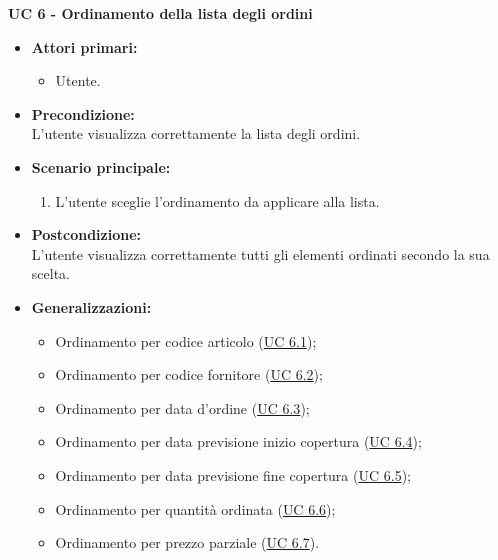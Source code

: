 \vspace{0.5cm}

\noindent \textbf{\large UC 6 - Ordinamento della lista degli ordini}
\label{uc:ordinamento-elementi-lista}
\begin{itemize}

	\item \textbf{Attori primari: }
		\begin{itemize}
			\item Utente.
		\end{itemize}

	\item \textbf{Precondizione: }\\[0.3cm]
		L'utente visualizza correttamente la lista degli ordini.

	\item \textbf{Scenario principale: }
		\begin{enumerate}
			\item L'utente sceglie l'ordinamento da applicare alla lista.
		\end{enumerate}
		

	\item \textbf{Postcondizione: }\\[0.3cm]
		L'utente visualizza correttamente tutti gli elementi ordinati secondo la sua scelta.
    
    \item \textbf{Generalizzazioni: }
        \begin{itemize}
            \item Ordinamento per codice articolo (\hyperref[uc:ordinamento-codice-articolo]{UC 6.1});
            \item Ordinamento per codice fornitore (\hyperref[uc:ordinamento-codice-fornitore]{UC 6.2});
            \item Ordinamento per data d'ordine (\hyperref[uc:ordinamento-data-ordine]{UC 6.3});
            \item Ordinamento per data previsione inizio copertura (\hyperref[uc:ordinamento-data-iniziale-copertura]{UC 6.4});
            \item Ordinamento per data previsione fine copertura (\hyperref[uc:ordinamento-data-finale-copertura]{UC 6.5});
            \item Ordinamento per quantità ordinata (\hyperref[uc:ordinamento-quantita-ordinata]{UC 6.6});
            \item Ordinamento per prezzo parziale (\hyperref[uc:ordinamento-prezzo-parziale-ord]{UC 6.7}).
        \end{itemize}
\end{itemize}

